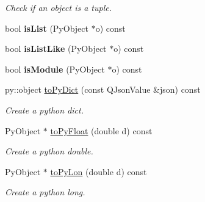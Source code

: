 \begin{Indent}
\begin{DoxyCompactItemize}
\begin{DoxyCompactList}\small\item\em Check if an object is a tuple. \end{DoxyCompactList}\item 
\mbox{\label{classrev_1_1_python_a_p_i_ab5939e273782b9b31a8f06d7dc8947a7}} 
bool {\bfseries is\+List} (Py\+Object $\ast$o) const
\item 
\mbox{\label{classrev_1_1_python_a_p_i_aa98c082604b3695ef282f13c3e3bebf8}} 
bool {\bfseries is\+List\+Like} (Py\+Object $\ast$o) const
\item 
\mbox{\label{classrev_1_1_python_a_p_i_a54ecb9c4a223acccb4b9839591539fe5}} 
bool {\bfseries is\+Module} (Py\+Object $\ast$o) const
\item 
\mbox{\label{classrev_1_1_python_a_p_i_a55047a604c01442f0c1145ae4bf207ec}} 
py\+::object \mbox{\hyperlink{classrev_1_1_python_a_p_i_a55047a604c01442f0c1145ae4bf207ec}{to\+Py\+Dict}} (const Q\+Json\+Value \&json) const
\begin{DoxyCompactList}\small\item\em Create a python dict. \end{DoxyCompactList}\item 
\mbox{\label{classrev_1_1_python_a_p_i_a6835c9d4b111afbf568c5cd275359cff}} 
Py\+Object $\ast$ \mbox{\hyperlink{classrev_1_1_python_a_p_i_a6835c9d4b111afbf568c5cd275359cff}{to\+Py\+Float}} (double d) const
\begin{DoxyCompactList}\small\item\em Create a python double. \end{DoxyCompactList}\item 
\mbox{\label{classrev_1_1_python_a_p_i_a8faa244ddbe6b61ac8d662dac8394665}} 
Py\+Object $\ast$ \mbox{\hyperlink{classrev_1_1_python_a_p_i_a8faa244ddbe6b61ac8d662dac8394665}{to\+Py\+Lon}} (double d) const
\begin{DoxyCompactList}\small\item\em Create a python long. \end{DoxyCompactList}\item 

\end{DoxyCompactItemize}
\end{Indent}
